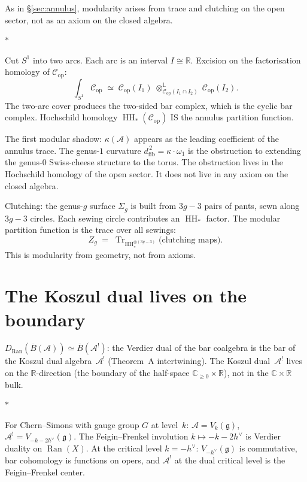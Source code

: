 \documentclass[11pt]{article}
\newcommand{\cA}{\mathcal{A}}
\newcommand{\cC}{\mathcal{C}}
\newcommand{\fg}{\mathfrak{g}}
\newcommand{\barB}{\overline{B}}
\newcommand{\C}{\mathbb{C}}
\newcommand{\R}{\mathbb{R}}
\newcommand{\Ran}{\operatorname{Ran}}
\newcommand{\HH}{\operatorname{HH}}
\newcommand{\Tr}{\operatorname{Tr}}
\newcommand{\dfib}{d_{\mathrm{fib}}}
\newcommand{\sep}{\bigskip\begin{center}$*$\end{center}\medskip}
\begin{document}
As in \S\ref{sec:annulus}, modularity arises from trace and
clutching on the open sector, not as an axiom on the closed algebra.

\sep

Cut $S^1$ into two arcs.  Each arc is an interval $I \cong \R$.
Excision on the factorisation homology of $\cC_{\mathrm{op}}$:
\[
\int_{S^1}\!\cC_{\mathrm{op}}
\;\simeq\;
\cC_{\mathrm{op}}(I_1)
\;\otimes_{\cC_{\mathrm{op}}(I_1 \cap I_2)}^{\mathbb{L}}\;
\cC_{\mathrm{op}}(I_2).
\]
The two-arc cover produces the two-sided bar complex, which is the
cyclic bar complex.  Hochschild homology
$\HH_*(\cC_{\mathrm{op}})$ IS the annulus partition function.

The first modular shadow: $\kappa(\cA)$ appears as the leading
coefficient of the annulus trace.  The genus-$1$ curvature
$\dfib^{\,2} = \kappa \cdot \omega_1$ is the obstruction to
extending the genus-$0$ Swiss-cheese structure to the torus.  The
obstruction lives in the Hochschild homology of the open sector.
It does not live in any axiom on the closed algebra.

Clutching: the genus-$g$ surface $\Sigma_g$ is built from $3g-3$
pairs of pants, sewn along $3g-3$ circles.  Each sewing circle
contributes an $\HH_*$ factor.  The modular partition function is
the trace over all sewings:
\[
Z_g
\;=\;
\Tr_{\HH_*^{\otimes(3g-3)}}
\bigl(\text{clutching maps}\bigr).
\]
This is modularity from geometry, not from axioms.


\section{The Koszul dual lives on the boundary}
\label{sec:koszul-dual-boundary}

$D_{\Ran}(\barB(\cA)) \simeq \barB(\cA^!)$: the Verdier dual of the bar
coalgebra is the bar of the Koszul dual algebra~$\cA^!$
(Theorem~A intertwining).  The Koszul dual~$\cA^!$ lives on
the $\R$-direction (the boundary of the half-space
$\C_{\geq 0} \times \R$), not in the $\C \times \R$ bulk.

\sep

For Chern--Simons with gauge group $G$ at level~$k$:
$\cA = V_k(\fg)$, $\cA^! = V_{-k-2h^\vee}(\fg)$.  The
Feigin--Frenkel involution $k \mapsto -k - 2h^\vee$ is Verdier
duality on $\Ran(X)$.  At the critical level $k = -h^\vee$:
$V_{-h^\vee}(\fg)$ is commutative, bar cohomology is functions on
opers, and $\cA^!$ at the dual critical level is the
Feigin--Frenkel center.
\end{document}
